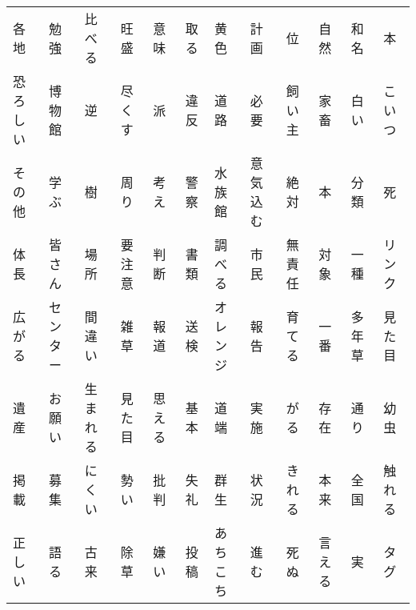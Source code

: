 \begin{table}[ht]
\begin{tabular}{llllllllllll}
  各地 & 勉強 & 比べる & 旺盛 & 意味 & 取る & 黄色 & 計画 & 位 & 自然 & 和名 & 本 \\ 
  恐ろしい & 博物館 & 逆 & 尽くす & 派 & 違反 & 道路 & 必要 & 飼い主 & 家畜 & 白い & こいつ \\ 
  その他 & 学ぶ & 樹 & 周り & 考え & 警察 & 水族館 & 意気込む & 絶対 & 本 & 分類 & 死 \\ 
  体長 & 皆さん & 場所 & 要注意 & 判断 & 書類 & 調べる & 市民 & 無責任 & 対象 & 一種 & リンク \\ 
  広がる & センター & 間違い & 雑草 & 報道 & 送検 & オレンジ & 報告 & 育てる & 一番 & 多年草 & 見た目 \\ 
  遺産 & お願い & 生まれる & 見た目 & 思える & 基本 & 道端 & 実施 & がる & 存在 & 通り & 幼虫 \\ 
  掲載 & 募集 & にくい & 勢い & 批判 & 失礼 & 群生 & 状況 & きれる & 本来 & 全国 & 触れる \\ 
  正しい & 語る & 古来 & 除草 & 嫌い & 投稿 & あちこち & 進む & 死ぬ & 言える & 実 & タグ \\ 
   \hline
\end{tabular}
\end{table}
